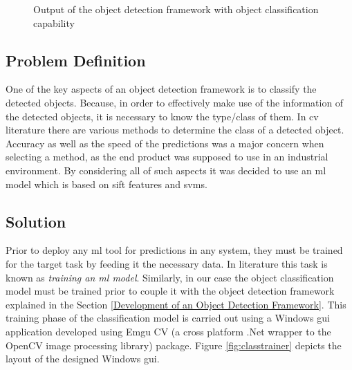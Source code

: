 \documentclass[a4paper,12pt]{report}%
\begin{document}
\begin{figure}[H]
	\centering
	\caption{Output of the object detection framework with object classification capability}
	\label{fig:classification}
\end{figure}


\subsection{Problem Definition}

One of the key aspects of an object detection framework is to classify the detected objects. Because, in order to effectively make use of the information of the detected objects, it is necessary to know the type/class of them. In \ac{cv} literature there are various methods to determine the class of a detected object. Accuracy as well as the speed of the predictions was a major concern when selecting a method, as the end product was supposed to use in an industrial environment. By considering all of such aspects it was decided to use an \ac{ml} model which is based on \ac{sift} features and \ac{svm}s.


\subsection{Solution}

Prior to deploy any \ac{ml} tool for predictions in any system, they must be trained for the target task by feeding it the necessary data. In literature this task is known as \textit{training an \ac{ml} model}. Similarly, in our case the object classification model must be trained prior to couple it with the object detection framework explained in the Section \ref{Development of an Object Detection Framework}. This training phase of the classification model is carried out using a Windows \ac{gui} application developed using Emgu CV (a cross platform .Net wrapper to the OpenCV image processing library) package\cite{emgucv}. Figure \ref{fig:classtrainer} depicts the layout of the designed Windows \ac{gui}.\\
\end{document}
